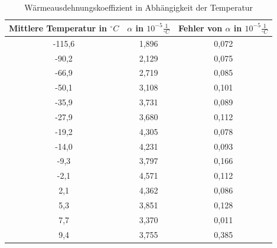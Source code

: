 \begin{table}
\centering
\begin{tabular}{ccc}

Mittlere Temperatur in $^{\circ}C$ &$ \alpha $ in $ 10^{-5}\frac {1}{^{\circ}C} $	&Fehler von $ \alpha $ in $ 10^{-5} \frac{1}{^{\circ}C}  $ \\
\toprule
-115,6&				1,896	&		0,072\\

-90,2	&			2,129	&		0,075\\

-66,9	&			2,719	&		0,085\\

-50,1	&			3,108	&		0,101\\

-35,9	&			3,731	&		0,089\\

-27,9	&			3,680	&		0,112\\

-19,2	&			4,305	&		0,078\\

-14,0	&			4,231	&		0,093\\

-9,3	&			3,797	&		0,166\\

-2,1	&			4,571	&		0,112\\

2,1		&		4,362		&	0,086\\

5,3		&		3,851		&	0,128\\

7,7		&		3,370		&	0,011\\

9,4		&		3,755		&	0,385\\

\end{tabular}
\label{tbl_4}
\caption{Wärmeausdehnungskoeffizient in Abhängigkeit der Temperatur}
\end{table}

